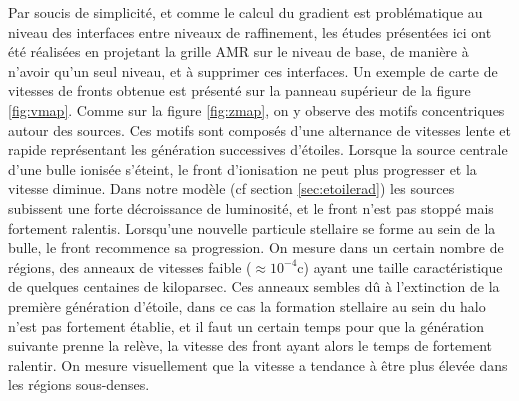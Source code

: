 Par soucis de simplicité, et comme le calcul du gradient est problématique au niveau des interfaces entre niveaux de raffinement, les études présentées ici ont été réalisées en projetant la grille \ac{AMR} sur le niveau de base, de manière à n'avoir qu'un seul niveau, et à supprimer ces interfaces.
Un exemple de carte de vitesses de fronts obtenue est présenté sur la panneau supérieur de la figure \ref{fig:vmap}.
Comme sur la figure \ref{fig:zmap}, on y observe des motifs concentriques autour des sources.
Ces motifs sont composés d'une alternance de vitesses lente et rapide représentant les génération successives d'étoiles.
Lorsque la source centrale d'une bulle ionisée s’éteint, le front d'ionisation ne peut plus progresser et la vitesse diminue.
Dans notre modèle (cf section \ref{sec:etoilerad}) les sources subissent une forte décroissance de luminosité, et le front n'est pas stoppé mais fortement ralentis.
Lorsqu'une nouvelle particule stellaire se forme au sein de la bulle, le front recommence sa progression.
On mesure dans un certain nombre de régions, des anneaux de vitesses faible ($\approx 10^{-4}$c) ayant une taille caractéristique de quelques centaines de kiloparsec.
Ces anneaux sembles dû à l'extinction de la première génération d'étoile, dans ce cas la formation stellaire au sein du halo n'est pas fortement établie, et il faut un certain temps pour que la génération suivante prenne la relève, la vitesse des front ayant alors le temps de fortement ralentir.
On mesure visuellement que la vitesse a tendance à être plus élevée dans les régions sous-denses.

